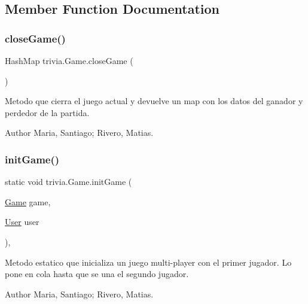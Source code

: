\subsection{Member Function Documentation}
\mbox{\label{classtrivia_1_1Game_af7ae2d61676f50cea2d5cd07fe37713f}} 
\subsubsection{\texorpdfstring{close\+Game()}{closeGame()}}
{\footnotesize\ttfamily Hash\+Map trivia.\+Game.\+close\+Game (\begin{DoxyParamCaption}{ }\end{DoxyParamCaption})\hspace{0.3cm}{\ttfamily [inline]}}

Metodo que cierra el juego actual y devuelve un map con los datos del ganador y perdedor de la partida. \begin{DoxyAuthor}{Author}
Maria, Santiago; Rivero, Matias. 
\end{DoxyAuthor}
\mbox{\label{classtrivia_1_1Game_acff76e402d22f7d1b17c2f8c878ec9fc}} 
\subsubsection{\texorpdfstring{init\+Game()}{initGame()}\hspace{0.1cm}{\footnotesize\ttfamily [1/2]}}
{\footnotesize\ttfamily static void trivia.\+Game.\+init\+Game (\begin{DoxyParamCaption}\item[{\mbox{\hyperlink{classtrivia_1_1Game}{Game}}}]{game,  }\item[{\mbox{\hyperlink{classtrivia_1_1User}{User}}}]{user }\end{DoxyParamCaption})\hspace{0.3cm}{\ttfamily [inline]}, {\ttfamily [static]}}

Metodo estatico que inicializa un juego multi-\/player con el primer jugador. Lo pone en cola hasta que se una el segundo jugador. \begin{DoxyAuthor}{Author}
Maria, Santiago; Rivero, Matias. 
\end{DoxyAuthor}

